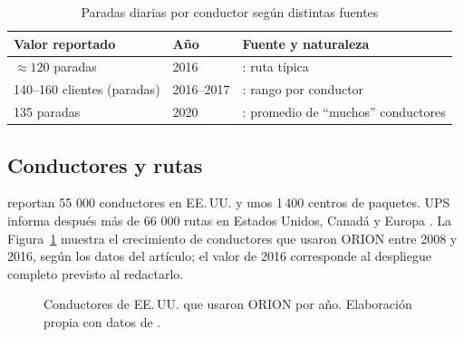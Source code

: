 \documentclass[11pt,a4paper]{article}
\begin{document}
\begin{table}[ht]
\centering\small
\caption{Paradas diarias por conductor según distintas fuentes}
\label{tab:paradas}
\begin{tabularx}{\textwidth}{@{}l l X@{}}
\toprule
Valor reportado & Año & Fuente y naturaleza \\
\midrule
$\approx 120$ paradas & 2016 & \textcite{clevenger2016}: ruta típica \\
140--160 clientes (paradas) & 2016--2017 & \textcite{holland2017}: rango por conductor \\
135 paradas & 2020 & \textcite{ups2020}: promedio de ``muchos'' conductores \\
\bottomrule
\end{tabularx}
\end{table}

\subsection{Conductores y rutas}
\textcite{holland2017} reportan 55 000 conductores en EE.\,UU. y unos 1\,400 centros de paquetes. UPS informa después más de 66 000 rutas en Estados Unidos, Canadá y Europa \parencite{ups2020}. La Figura~\ref{fig:conductores} muestra el crecimiento de conductores que usaron ORION entre 2008 y 2016, según los datos del artículo; el valor de 2016 corresponde al despliegue completo previsto al redactarlo.

\begin{figure}[ht]
\centering
{}
\caption{Conductores de EE.\,UU. que usaron ORION por año. Elaboración propia con datos de \textcite{holland2017}.}
\label{fig:conductores}
\end{figure}
\end{document}
